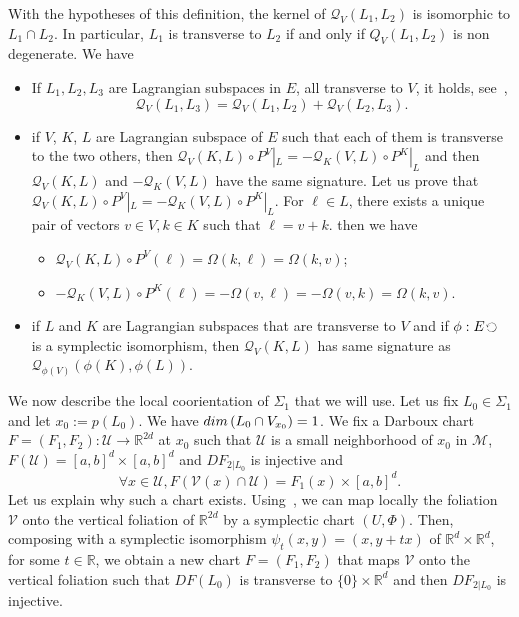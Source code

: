 \documentclass[10pt,a4paper]{amsart}
\numberwithin{equation}{section}
\newcommand*\M{\mathcal{M}}
\newcommand*\cq{\mathcal{Q}}
\newcommand*\cU{\mathcal{U}}
\newcommand*\cV{\mathcal{V}}
\newcommand*\cal{\mathcal}
\newcommand*\R{\mathbb{R}}
\renewcommand*\dim{{\rm dim}\,}
\let\oldforall\forall
\renewcommand*{\forall}{\mathrel{\oldforall}}
\theoremstyle{definition}
\theoremstyle{remark}
\begin{document}
With the hypotheses of this definition, the kernel of $ \cq_V(L_1,L_2)$ is isomorphic to $L_1\cap L_2$. In particular, $L_1$ is transverse to $L_2$ if and only if $Q_V(L_1,L_2)$ is non degenerate.\newline
We have
\begin{itemize}
\item If $L_1,L_2,L_3$ are Lagrangian subspaces in $E$, all transverse to $V$, it holds, see~\cite{Arn08},
\begin{equation}\label{prop:quadr:form}
\cq_V(L_1,L_3)=\cq_V(L_1,L_2)+\cq_V(L_2,L_3).
\end{equation}
\item if $V$, $K$, $L$ are Lagrangian subspace of $E$ such that each of them is transverse to the two others, then { $\cq_V(K,L)\circ P^V|_{L}=-\cq_K(V,L)\circ P^K|_{L}$ and then} $\cq_V(K,L)$ and $-\cq_K(V,L)$ have the same signature.\newline
Let us prove that $\cq_V(K,L)\circ P^V|_{L}=-\cq_K(V,L)\circ P^K|_{L}$. For $\ell\in L$, there exists a unique pair of vectors $v\in V, k\in K$ such that $\ell=v+k$. then we have
\begin{itemize}
\item $\cq_V(K,L)\circ P^V(\ell)=\Omega(k, \ell)=\Omega(k, v)$;
\item $-\cq_K(V,L)\circ P^K(\ell)=-\Omega(v, \ell)=-\Omega(v, k)=\Omega(k, v) $.
\end{itemize}

\item if $L$ and $K$ are Lagrangian subspaces that are transverse to $V$ and if $\phi:E\,\rotatebox[origin=c]{90}{$\circlearrowleft$}\,$ is a symplectic isomorphism, then $\cq_V(K, L)$ has same signature as $\cq_{\phi(V)}(\phi(K), \phi(L))$.
\end{itemize}
We now describe the local coorientation of $\Sigma_1$ that we will use. Let us fix $L_0\in\Sigma_1$ and let $x_0:=p(L_0)$. We have $\dim(L_0\cap V_{x_0})=1$. We fix a Darboux chart $F=(F_1, F_2): \cU\rightarrow\R^{2d}$ at $x_0$ such that $\cal U$ is a small neighborhood of $x_0$ in $\M$, $F(\cal U)=[a, b]^{d}\times [a, b]^d$ and $DF_{2|L_0}$ is injective and
\[
\forall x\in \cU, F({ \cV(x)}\cap \cal U)= F_1(x)\times [a, b]^d.
\]
Let us explain why such a chart exists. Using~\cite[Theorem~7.1]{Weinstein1971}, we can map locally the foliation $\cV$ onto the vertical foliation of $\R^{2d}$ by a symplectic chart $(U, \Phi)$. Then, composing with a symplectic isomorphism $\psi_t(x, y)=(x, y+tx)$ of $\R^d\times\R^d$, for some $t\in\R$, we obtain a new chart $F=(F_1, F_2)$ that maps $\cV$ onto the vertical foliation such that $DF(L_0)$ is transverse to $\{0\}\times \R^d$ and then $DF_{2|L_0}$ is injective.
\end{document}
